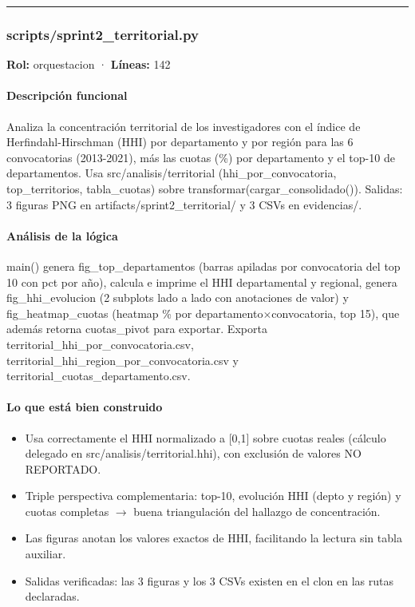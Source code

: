 \medskip
\hrule

\subsubsection{scripts/sprint2\_territorial.py}
\textbf{Rol:} orquestacion · \textbf{Líneas:} 142

\paragraph{Descripción funcional}
Analiza la concentración territorial de los investigadores con el índice de Herfindahl-Hirschman (HHI) por departamento y por región para las 6 convocatorias (2013-2021), más las cuotas (\%) por departamento y el top-10 de departamentos. Usa src/analisis/territorial (hhi\_por\_convocatoria, top\_territorios, tabla\_cuotas) sobre transformar(cargar\_consolidado()). Salidas: 3 figuras PNG en artifacts/sprint2\_territorial/ y 3 CSVs en evidencias/.

\paragraph{Análisis de la lógica}
main() genera fig\_top\_departamentos (barras apiladas por convocatoria del top 10 con pct por año), calcula e imprime el HHI departamental y regional, genera fig\_hhi\_evolucion (2 subplots lado a lado con anotaciones de valor) y fig\_heatmap\_cuotas (heatmap \% por departamento$\times$convocatoria, top 15), que además retorna cuotas\_pivot para exportar. Exporta territorial\_hhi\_por\_convocatoria.csv, territorial\_hhi\_region\_por\_convocatoria.csv y territorial\_cuotas\_departamento.csv.

\paragraph{Lo que está bien construido}
\begin{itemize}
  \item Usa correctamente el HHI normalizado a [0,1] sobre cuotas reales (cálculo delegado en src/analisis/territorial.hhi), con exclusión de valores NO REPORTADO.
  \item Triple perspectiva complementaria: top-10, evolución HHI (depto y región) y cuotas completas $\rightarrow$ buena triangulación del hallazgo de concentración.
  \item Las figuras anotan los valores exactos de HHI, facilitando la lectura sin tabla auxiliar.
  \item Salidas verificadas: las 3 figuras y los 3 CSVs existen en el clon en las rutas declaradas.
\end{itemize}

